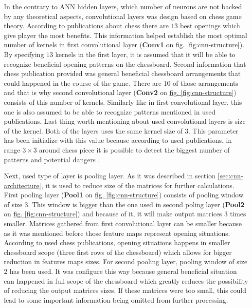 In the contrary to ANN hidden layers, which number of neurons are not backed by any theoretical aspects, convolutional layers was design based on chess game theory. According to publications about chess there are $13$ best openings which give player the most benefits. This information helped establish the most optimal number of kernels in first convolutional layer (\textbf{Conv1} on \hyperref[fig:cnn-structure]{fig. \ref*{fig:cnn-structure}}). By specifying $13$ kernels in the first layer, it is assumed that it will be able to recognize beneficial opening patterns on the chessboard. Second information that chess publication provided was general beneficial chessboard arrangements that could happened in the course of the game. There are $10$ of those arrangements \cite{bib:book-mastering-chess-logic,bib:book-chess-bible,bib:book-bobby-fisher-teaches-chess} and that is why second convolutional layer (\textbf{Conv2} on \hyperref[fig:cnn-structure]{fig. \ref*{fig:cnn-structure}}) consists of this number of kernels. Similarly like in first convolutional layer, this one is also assumed to be able to recognize patterns mentioned in used publications. Last thing worth mentioning about used convolutional layers is size of the kernel. Both of the layers uses the same kernel size of $3$. This parameter has been initialize with this value because according to used publications, in range $3 \times 3$ around chess piece it is possible to detect the biggest number of patterns and potential dangers \cite{bib:book-mastering-chess-logic,bib:book-chess-bible,bib:book-bobby-fisher-teaches-chess}. 

Next, used type of layer is pooling layer. As it was described in section \ref{sec:cnn-architecture}, it is used to reduce size of the matrices for further calculations. First pooling layer (\textbf{Pool1} on \hyperref[fig:cnn-structure]{fig. \ref*{fig:cnn-structure}}) consists of pooling window of size $3$. This window is bigger than the one used in second poling layer (\textbf{Pool2} on \hyperref[fig:cnn-structure]{fig. \ref*{fig:cnn-structure}}) and because of it, it will make output matrices 3 times smaller. Matrices gathered from first convolutional layer can be smaller because as it was mentioned before those feature maps represent opening situations. According to used chess publications, opening situations happens in smaller chessboard scope (three first rows of the chessboard) which allows for bigger reduction in features maps sizes. For second pooling layer, pooling window of size $2$ has been used. It was configure this way because general beneficial situation can happened in full scope of the chessboard which greatly reduces the possibility of reducing the output matrices sizes. If these matrices were too small, this could lead to some important information being omitted from further processing.

